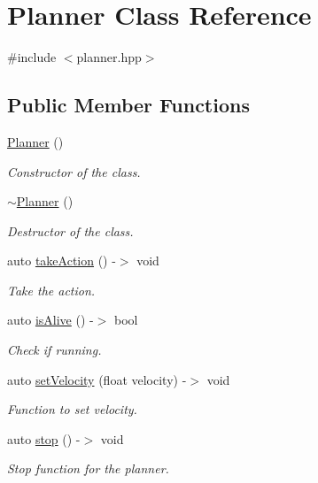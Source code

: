 \hypertarget{class_planner}{}\section{Planner Class Reference}
\label{class_planner}


{\ttfamily \#include $<$planner.\+hpp$>$}

\subsection*{Public Member Functions}
\begin{DoxyCompactItemize}
\item 
\hyperlink{class_planner_aceff4e3c859cc6bea1fda3c9e4ad034f}{Planner} ()
\begin{DoxyCompactList}\small\item\em Constructor of the class. \end{DoxyCompactList}\item 
\hyperlink{class_planner_ac3db7cf113ad368fa6fce636b6e94abe}{$\sim$\+Planner} ()
\begin{DoxyCompactList}\small\item\em Destructor of the class. \end{DoxyCompactList}\item 
auto \hyperlink{class_planner_a2912d9cf4a7829f426235ca034f82a8c}{take\+Action} () -\/$>$ void
\begin{DoxyCompactList}\small\item\em Take the action. \end{DoxyCompactList}\item 
auto \hyperlink{class_planner_a2ececa5b75f299577946cd0052e113d9}{is\+Alive} () -\/$>$ bool
\begin{DoxyCompactList}\small\item\em Check if running. \end{DoxyCompactList}\item 
auto \hyperlink{class_planner_adef66489519340083870df8b439408a1}{set\+Velocity} (float velocity) -\/$>$ void
\begin{DoxyCompactList}\small\item\em Function to set velocity. \end{DoxyCompactList}\item 
auto \hyperlink{class_planner_a1fcd576062dcbad33615c6422289088d}{stop} () -\/$>$ void
\begin{DoxyCompactList}\small\item\em Stop function for the planner. \end{DoxyCompactList}\end{DoxyCompactItemize}



